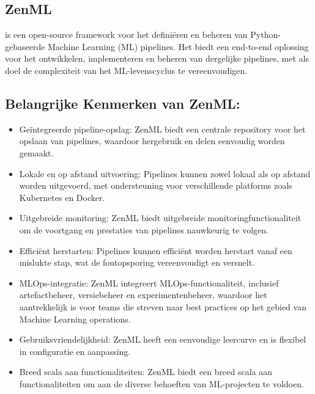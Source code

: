 \subsection{ZenML}

\textcite{ZenML2024} is een open-source framework voor het definiëren en beheren van Python-gebaseerde Machine Learning (ML) pipelines. Het biedt een end-to-end oplossing voor het ontwikkelen, implementeren en beheren van dergelijke pipelines, met als doel de complexiteit van het ML-levenscyclus te vereenvoudigen.

\subsection{Belangrijke Kenmerken van ZenML:}
\begin{itemize}
    \item Geïntegreerde pipeline-opslag: ZenML biedt een centrale repository voor het opslaan van pipelines, waardoor hergebruik en delen eenvoudig worden gemaakt.
    \item Lokale en op afstand uitvoering: Pipelines kunnen zowel lokaal als op afstand worden uitgevoerd, met ondersteuning voor verschillende platforms zoals Kubernetes en Docker.
    \item Uitgebreide monitoring: ZenML biedt uitgebreide monitoringfunctionaliteit om de voortgang en prestaties van pipelines nauwkeurig te volgen.
    \item Efficiënt herstarten: Pipelines kunnen efficiënt worden herstart vanaf een mislukte stap, wat de foutopsporing vereenvoudigt en versnelt.
    \item MLOps-integratie: ZenML integreert MLOps-functionaliteit, inclusief artefactbeheer, versiebeheer en experimentenbeheer, waardoor het aantrekkelijk is voor teams die streven naar best practices op het gebied van Machine Learning operations.
    \item Gebruiksvriendelijkheid: ZenML heeft een eenvoudige leercurve en is flexibel in configuratie en aanpassing.
    \item Breed scala aan functionaliteiten: ZenML biedt een breed scala aan functionaliteiten om aan de diverse behoeften van ML-projecten te voldoen.
\end{itemize}

